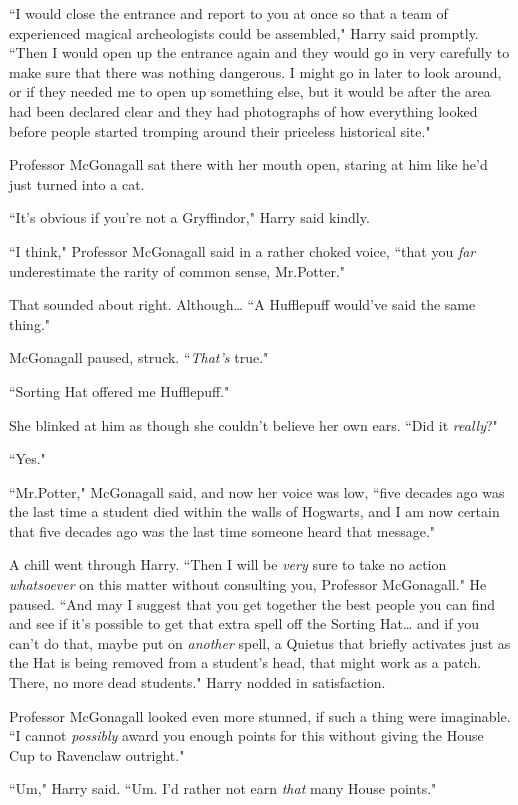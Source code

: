 ``I would close the entrance and report to you at once so that a team of experienced magical archeologists could be assembled," Harry said promptly. ``Then I would open up the entrance again and they would go in very carefully to make sure that there was nothing dangerous. I might go in later to look around, or if they needed me to open up something else, but it would be after the area had been declared clear and they had photographs of how everything looked before people started tromping around their priceless historical site."

Professor McGonagall sat there with her mouth open, staring at him like he'd just turned into a cat.

``It's obvious if you're not a Gryffindor," Harry said kindly.

``I think," Professor McGonagall said in a rather choked voice, ``that you \emph{far} underestimate the rarity of common sense, Mr.\?Potter."

That sounded about right. Although{\ldots} ``A Hufflepuff would've said the same thing."

McGonagall paused, struck. ``\emph{That's} true."

``Sorting Hat offered me Hufflepuff."

She blinked at him as though she couldn't believe her own ears. ``Did it \emph{really}?"

``Yes."

``Mr.\?Potter," McGonagall said, and now her voice was low, ``five decades ago was the last time a student died within the walls of Hogwarts, and I am now certain that five decades ago was the last time someone heard that message."

A chill went through Harry. ``Then I will be \emph{very} sure to take no action \emph{whatsoever} on this matter without consulting you, Professor McGonagall." He paused. ``And may I suggest that you get together the best people you can find and see if it's possible to get that extra spell off the Sorting Hat{\ldots} and if you can't do that, maybe put on \emph{another} spell, a Quietus that briefly activates just as the Hat is being removed from a student's head, that might work as a patch. There, no more dead students." Harry nodded in satisfaction.

Professor McGonagall looked even more stunned, if such a thing were imaginable. ``I cannot \emph{possibly} award you enough points for this without giving the House Cup to Ravenclaw outright."

``Um," Harry said. ``Um. I'd rather not earn \emph{that} many House points."

